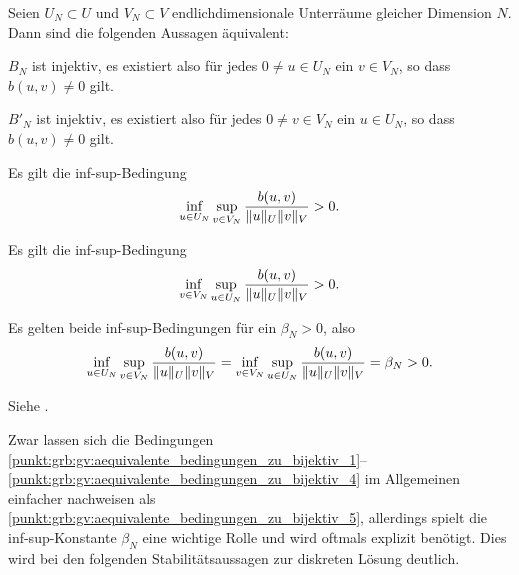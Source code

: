 \begin{Satz}
\label{satz:grb:gv:aequivalente_bedingungen_zu_bijektiv}
    Seien $U_{N} \subset U$ und $V_{N} \subset V$ endlichdimensionale Unterräume gleicher Dimension $N$.
    Dann sind die folgenden Aussagen äquivalent:
    \begin{thmenumerate}
        \item\label{punkt:grb:gv:aequivalente_bedingungen_zu_bijektiv_1} $B_{N}$ ist injektiv, es existiert also für jedes $0 \neq u \in U_{N}$ ein $v \in V_{N}$, so dass $b(u, v) \neq 0$ gilt.
        \item\label{punkt:grb:gv:aequivalente_bedingungen_zu_bijektiv_2} $B'_{N}$ ist injektiv, es existiert also für jedes $0 \neq v \in V_{N}$ ein $u \in U_{N}$, so dass $b(u, v) \neq 0$ gilt.
        \item\label{punkt:grb:gv:aequivalente_bedingungen_zu_bijektiv_3} Es gilt die inf-sup-Bedingung
            \begin{equation}
                \inf_{u \in U_{N}} \sup_{v \in V_{N}} \frac{b(u, v)}{\lVert u\rVert_{U} \lVert v\rVert_{V}} > 0.
            \end{equation}
        \item\label{punkt:grb:gv:aequivalente_bedingungen_zu_bijektiv_4} Es gilt die inf-sup-Bedingung
            \begin{equation}
                \inf_{v \in V_{N}} \sup_{u \in U_{N}} \frac{b(u, v)}{\lVert u\rVert_{U} \lVert v\rVert_{V}} > 0.
            \end{equation}
        \item\label{punkt:grb:gv:aequivalente_bedingungen_zu_bijektiv_5} Es gelten beide inf-sup-Bedingungen für ein $\beta_{N} > 0$, also
            \begin{equation}
                \inf_{u \in U_{N}} \sup_{v \in V_{N}} \frac{b(u, v)}{\lVert u\rVert_{U} \lVert v\rVert_{V}}
                = \inf_{v \in V_{N}} \sup_{u \in U_{N}} \frac{b(u, v)}{\lVert u\rVert_{U} \lVert v\rVert_{V}}
                = \beta_{N} > 0.
            \end{equation}
    \end{thmenumerate}

    \begin{Beweis}
        Siehe \cite[Proposition 3.1]{Nochetto:2009il}.
    \end{Beweis}
\end{Satz}

Zwar lassen sich die Bedingungen \ref{punkt:grb:gv:aequivalente_bedingungen_zu_bijektiv_1}--\ref{punkt:grb:gv:aequivalente_bedingungen_zu_bijektiv_4} im Allgemeinen einfacher nachweisen als \ref{punkt:grb:gv:aequivalente_bedingungen_zu_bijektiv_5}, allerdings spielt die inf-sup-Konstante $\beta_{N}$ eine wichtige Rolle und wird oftmals explizit benötigt.
Dies wird bei den folgenden Stabilitätsaussagen zur diskreten Lösung deutlich.

